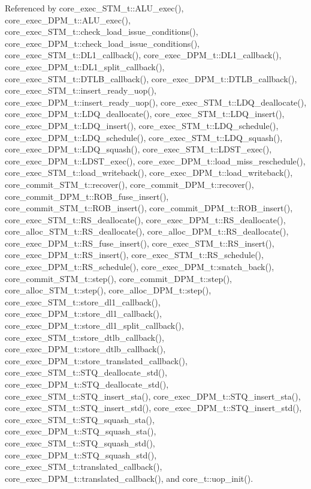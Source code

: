 Referenced by core\_\-exec\_\-STM\_\-t::ALU\_\-exec(), core\_\-exec\_\-DPM\_\-t::ALU\_\-exec(), core\_\-exec\_\-STM\_\-t::check\_\-load\_\-issue\_\-conditions(), core\_\-exec\_\-DPM\_\-t::check\_\-load\_\-issue\_\-conditions(), core\_\-exec\_\-STM\_\-t::DL1\_\-callback(), core\_\-exec\_\-DPM\_\-t::DL1\_\-callback(), core\_\-exec\_\-DPM\_\-t::DL1\_\-split\_\-callback(), core\_\-exec\_\-STM\_\-t::DTLB\_\-callback(), core\_\-exec\_\-DPM\_\-t::DTLB\_\-callback(), core\_\-exec\_\-STM\_\-t::insert\_\-ready\_\-uop(), core\_\-exec\_\-DPM\_\-t::insert\_\-ready\_\-uop(), core\_\-exec\_\-STM\_\-t::LDQ\_\-deallocate(), core\_\-exec\_\-DPM\_\-t::LDQ\_\-deallocate(), core\_\-exec\_\-STM\_\-t::LDQ\_\-insert(), core\_\-exec\_\-DPM\_\-t::LDQ\_\-insert(), core\_\-exec\_\-STM\_\-t::LDQ\_\-schedule(), core\_\-exec\_\-DPM\_\-t::LDQ\_\-schedule(), core\_\-exec\_\-STM\_\-t::LDQ\_\-squash(), core\_\-exec\_\-DPM\_\-t::LDQ\_\-squash(), core\_\-exec\_\-STM\_\-t::LDST\_\-exec(), core\_\-exec\_\-DPM\_\-t::LDST\_\-exec(), core\_\-exec\_\-DPM\_\-t::load\_\-miss\_\-reschedule(), core\_\-exec\_\-STM\_\-t::load\_\-writeback(), core\_\-exec\_\-DPM\_\-t::load\_\-writeback(), core\_\-commit\_\-STM\_\-t::recover(), core\_\-commit\_\-DPM\_\-t::recover(), core\_\-commit\_\-DPM\_\-t::ROB\_\-fuse\_\-insert(), core\_\-commit\_\-STM\_\-t::ROB\_\-insert(), core\_\-commit\_\-DPM\_\-t::ROB\_\-insert(), core\_\-exec\_\-STM\_\-t::RS\_\-deallocate(), core\_\-exec\_\-DPM\_\-t::RS\_\-deallocate(), core\_\-alloc\_\-STM\_\-t::RS\_\-deallocate(), core\_\-alloc\_\-DPM\_\-t::RS\_\-deallocate(), core\_\-exec\_\-DPM\_\-t::RS\_\-fuse\_\-insert(), core\_\-exec\_\-STM\_\-t::RS\_\-insert(), core\_\-exec\_\-DPM\_\-t::RS\_\-insert(), core\_\-exec\_\-STM\_\-t::RS\_\-schedule(), core\_\-exec\_\-DPM\_\-t::RS\_\-schedule(), core\_\-exec\_\-DPM\_\-t::snatch\_\-back(), core\_\-commit\_\-STM\_\-t::step(), core\_\-commit\_\-DPM\_\-t::step(), core\_\-alloc\_\-STM\_\-t::step(), core\_\-alloc\_\-DPM\_\-t::step(), core\_\-exec\_\-STM\_\-t::store\_\-dl1\_\-callback(), core\_\-exec\_\-DPM\_\-t::store\_\-dl1\_\-callback(), core\_\-exec\_\-DPM\_\-t::store\_\-dl1\_\-split\_\-callback(), core\_\-exec\_\-STM\_\-t::store\_\-dtlb\_\-callback(), core\_\-exec\_\-DPM\_\-t::store\_\-dtlb\_\-callback(), core\_\-exec\_\-DPM\_\-t::store\_\-translated\_\-callback(), core\_\-exec\_\-STM\_\-t::STQ\_\-deallocate\_\-std(), core\_\-exec\_\-DPM\_\-t::STQ\_\-deallocate\_\-std(), core\_\-exec\_\-STM\_\-t::STQ\_\-insert\_\-sta(), core\_\-exec\_\-DPM\_\-t::STQ\_\-insert\_\-sta(), core\_\-exec\_\-STM\_\-t::STQ\_\-insert\_\-std(), core\_\-exec\_\-DPM\_\-t::STQ\_\-insert\_\-std(), core\_\-exec\_\-STM\_\-t::STQ\_\-squash\_\-sta(), core\_\-exec\_\-DPM\_\-t::STQ\_\-squash\_\-sta(), core\_\-exec\_\-STM\_\-t::STQ\_\-squash\_\-std(), core\_\-exec\_\-DPM\_\-t::STQ\_\-squash\_\-std(), core\_\-exec\_\-STM\_\-t::translated\_\-callback(), core\_\-exec\_\-DPM\_\-t::translated\_\-callback(), and core\_\-t::uop\_\-init().
